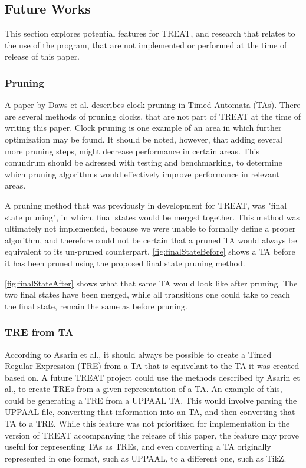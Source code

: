 \subsection{Future Works}\label{subsec:futureWorks}
This section explores potential features for TREAT, and research that relates to the use of the program, that are not implemented or performed at the time of release of this paper.

\subsubsection{Pruning}\label{futureWorks:pruning}
A paper by Daws et al. \cite{Daws1996} describes clock pruning in Timed Automata (TAs). There are several methods of pruning clocks, that are not part of TREAT at the time of writing this paper.
Clock pruning is one example of an area in which further optimization may be found. It should be noted, however, that adding several more pruning steps, might decrease performance in certain areas.
This conundrum should be adressed with testing and benchmarking, to determine which pruning algorithms would effectively improve performance in relevant areas.

\vspace{.5\baselineskip plus 2pt}
A pruning method that was previously in development for TREAT, was "final state pruning", in which, final states would be merged together. This method was ultimately not implemented, because we were unable to formally define a proper algorithm, and therefore could not be certain that a pruned TA would always be equivalent to its un-pruned counterpart.
\cref{fig:finalStateBefore} shows a TA before it has been pruned using the proposed final state pruning method.

\vspace{0.75em}

\cref{fig:finalStateAfter} shows what that same TA would look like after pruning. The two final states have been merged, while all transitions one could take to reach the final state, remain the same as before pruning.



\subsubsection{TRE from TA}
According to Asarin et al.\cite{Eugene2001}, it should always be possible to create a Timed Regular Expression (TRE) from a TA that is equivelant to the TA it was created based on.
A future TREAT project could use the methods described by Asarin et al., to create TREs from a given representation of a TA. An example of this, could be generating a TRE from a UPPAAL TA.
This would involve parsing the UPPAAL file, converting that information into an TA, and then converting that TA to a TRE.
While this feature was not prioritized for implementation in the version of TREAT accompanying the release of this paper, the feature may prove useful for representing TAs as TREs, and even converting a TA originally represented in one format, such as UPPAAL, to a different one, such as TikZ.

